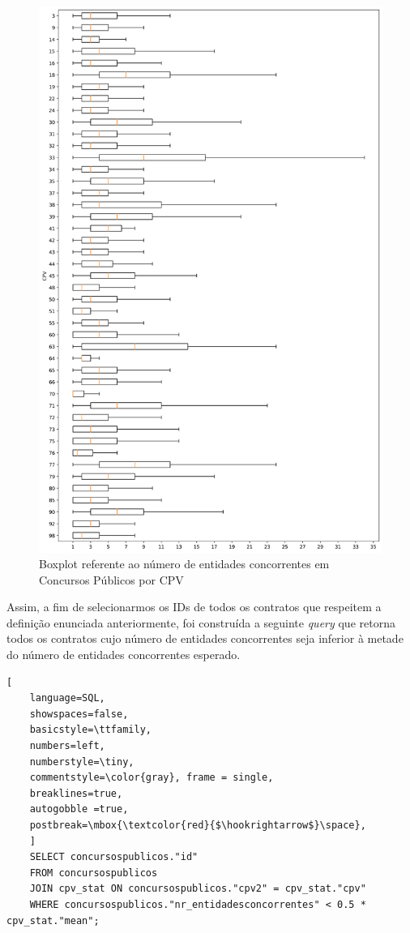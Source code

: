 \begin{figure}[H]
	\centering
	\includegraphics[width=.9\textwidth]{imagens/cpv3.png}
	\caption{Boxplot referente ao número de entidades concorrentes em Concursos Públicos por CPV }
	\label{}
\end{figure}


Assim, a fim de selecionarmos os IDs de todos os contratos que respeitem a definição enunciada anteriormente, foi construída a seguinte \textit{query} que retorna todos os contratos cujo número de entidades concorrentes seja inferior à metade do número de entidades concorrentes esperado.  

\begin{lstlisting}[
	language=SQL,
	showspaces=false,
	basicstyle=\ttfamily,
	numbers=left,
	numberstyle=\tiny,
	commentstyle=\color{gray}, frame = single,
	breaklines=true,
	autogobble =true,
	postbreak=\mbox{\textcolor{red}{$\hookrightarrow$}\space},
	]
	SELECT concursospublicos."id"
	FROM concursospublicos 
	JOIN cpv_stat ON concursospublicos."cpv2" = cpv_stat."cpv"
	WHERE concursospublicos."nr_entidadesconcorrentes" < 0.5 * cpv_stat."mean";
\end{lstlisting}

